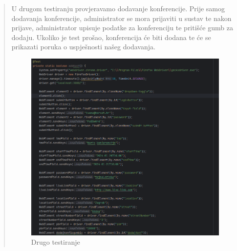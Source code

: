 \begin{packed_enum}
				\begin{quote}
					U drugom testiranju provjeravamo dodavanje konferencije. Prije samog dodavanja konferencije, administrator se mora prijaviti u sustav te nakon prijave, administrator upisuje podatke za konferenciju te pritišće gumb za dodaju. Ukoliko je test prošao, konferencija će biti dodana te će se prikazati poruka o uspješnosti našeg dodavanja.
					\begin{figure}[H]
						\includegraphics[width=\textwidth]{slike/Selenium2.png} %
						\caption{Drugo testiranje}
						\label{fig:Selenium2} %
					\end{figure}
				\end{quote}
				

\end{packed_enum}
